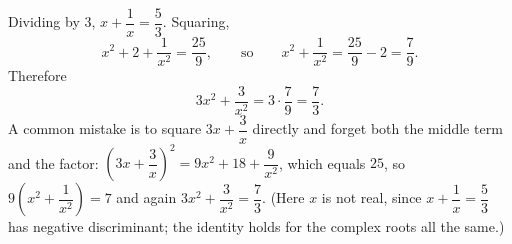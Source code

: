 Dividing by $3$, $x+\dfrac{1}{x}=\dfrac{5}{3}$. Squaring,
\[
x^2+2+\dfrac{1}{x^2}=\dfrac{25}{9},\qquad\text{so}\qquad x^2+\dfrac{1}{x^2}=\dfrac{25}{9}-2=\dfrac{7}{9}.
\]
Therefore
\[
3x^2+\dfrac{3}{x^2}=3\cdot\dfrac{7}{9}=\boxed{\dfrac{7}{3}}.
\]
A common mistake is to square $3x+\dfrac{3}{x}$ directly and forget both the middle term and the factor: $\left(3x+\dfrac{3}{x}\right)^2=9x^2+18+\dfrac{9}{x^2}$, which equals $25$, so $9\left(x^2+\dfrac{1}{x^2}\right)=7$ and again $3x^2+\dfrac{3}{x^2}=\dfrac{7}{3}$. (Here $x$ is not real, since $x+\dfrac{1}{x}=\dfrac{5}{3}$ has negative discriminant; the identity holds for the complex roots all the same.)
